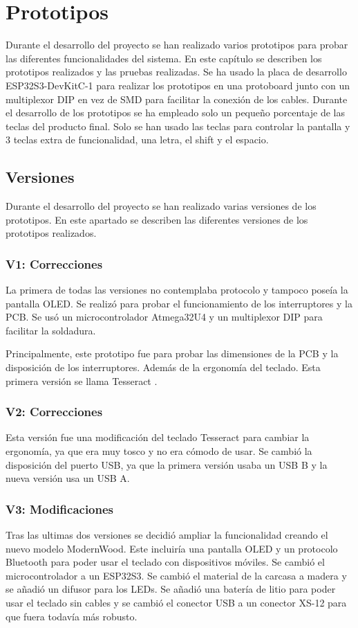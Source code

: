 \chapter{Prototipos}

Durante el desarrollo del proyecto se han realizado varios prototipos para probar las diferentes funcionalidades del sistema. En este capítulo se describen los prototipos realizados y las pruebas realizadas. Se ha usado la placa de desarrollo ESP32S3-DevKitC-1 para realizar los prototipos en una protoboard junto con un multiplexor DIP en vez de SMD para facilitar la conexión de los cables. Durante el desarrollo de los prototipos se ha empleado solo un pequeño porcentaje de las teclas del producto final. Solo se han usado las teclas para controlar la pantalla y 3 teclas extra de funcionalidad, una letra, el shift y el espacio.


\section{Versiones}
Durante el desarrollo del proyecto se han realizado varias versiones de los prototipos. En este apartado se describen las diferentes versiones de los prototipos realizados.

\subsection{V1: Correcciones}
La primera de todas las versiones no contemplaba protocolo  y tampoco poseía la pantalla \gls{OLED}. Se realizó para probar el funcionamiento de los interruptores y la \gls{PCB}. Se usó un microcontrolador Atmega32U4 y un multiplexor DIP para facilitar la soldadura.

Principalmente, este prototipo fue para probar las dimensiones de la \gls{PCB} y la disposición de los interruptores. Además de la ergonomía del teclado. Esta primera versión se llama Tesseract \cite{Tesseract}.

\subsection{V2: Correcciones}
Esta versión fue una modificación del teclado Tesseract \cite{Tesseract} para cambiar la ergonomía, ya que era muy tosco y no era cómodo de usar. Se cambió la disposición del puerto \gls{USB}, ya que la primera versión usaba un \gls{USB} B y la nueva versión usa un \gls{USB} A.

\subsection{V3: Modificaciones}
Tras las ultimas dos versiones se decidió ampliar la funcionalidad creando el nuevo modelo ModernWood. Este incluiría una pantalla \gls{OLED} y un protocolo \gls{Bluetooth} para poder usar el teclado con dispositivos móviles. Se cambió el microcontrolador a un ESP32S3. Se cambió el material de la carcasa a madera y se añadió un difusor para los \gls{LED}s. Se añadió una batería de litio para poder usar el teclado sin cables y se cambió el conector \gls{USB} a un conector XS-12 para que fuera todavía más robusto.

